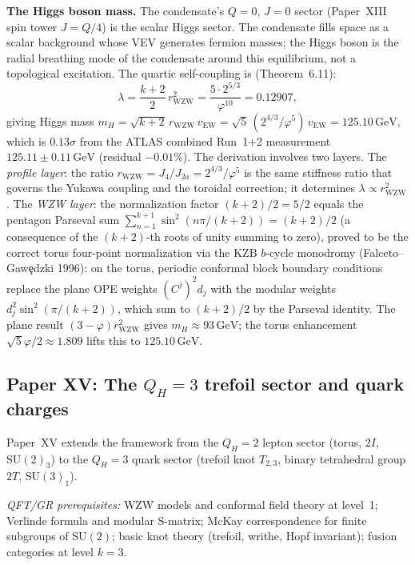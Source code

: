 \documentclass[11pt,a4paper]{article}
\newcommand{\vp}{\varphi}
\newcommand{\twoI}{2I}
\newcommand{\vEW}{v_{\mathrm{EW}}}
\newcommand{\mH}{m_H}
\begin{document}
\textbf{The Higgs boson mass.}
The condensate's $Q=0$, $J=0$ sector (Paper~XIII spin tower $J=Q/4$) is the scalar
Higgs sector. The condensate fills space as a scalar background whose VEV generates
fermion masses; the Higgs boson is the radial breathing mode of the condensate around
this equilibrium, not a topological excitation.
The quartic self-coupling is (Theorem~6.11):
\begin{equation}
  \lambda = \frac{k+2}{2}\,r_{\mathrm{WZW}}^2
  = \frac{5\cdot 2^{5/3}}{\vp^{10}} = 0.12907,
\end{equation}
giving Higgs mass $\mH = \sqrt{k+2}\,r_{\mathrm{WZW}}\,\vEW
= \sqrt{5}\,(2^{4/3}/\vp^5)\,\vEW = 125.10\,\mathrm{GeV}$,
which is $0.13\sigma$ from the ATLAS combined Run~1+2 measurement
$125.11\pm0.11\,\mathrm{GeV}$ (residual $-0.01\%$).
The derivation involves two layers.
The \emph{profile layer}: the ratio $r_{\mathrm{WZW}} = J_4/J_{2a} = 2^{4/3}/\vp^5$
is the same stiffness ratio that governs the Yukawa coupling and the toroidal
correction; it determines $\lambda \propto r_{\mathrm{WZW}}^2$.
The \emph{WZW layer}: the normalization factor $(k+2)/2 = 5/2$ equals the
pentagon Parseval sum $\sum_{n=1}^{k+1}\sin^2(n\pi/(k+2)) = (k+2)/2$
(a consequence of the $(k+2)$-th roots of unity summing to zero), proved to be
the correct torus four-point normalization via the KZB $b$-cycle monodromy
(Falceto--Gaw\c{e}dzki 1996): on the torus, periodic conformal block boundary
conditions replace the plane OPE weights $(C^j)^2 d_j$ with the modular
weights $d_j^2\sin^2(\pi/(k+2))$, which sum to $(k+2)/2$ by the Parseval
identity.
The plane result $(3-\vp)r_{\mathrm{WZW}}^2$ gives $\mH \approx 93\,\mathrm{GeV}$;
the torus enhancement $\sqrt{5}\vp/2 \approx 1.809$ lifts this to $125.10\,\mathrm{GeV}$.

\subsection{Paper XV: The $Q_H=3$ trefoil sector and quark charges}

Paper~XV extends the framework from the $Q_H=2$ lepton sector (torus, $\twoI$,
$\mathrm{SU}(2)_3$) to the $Q_H=3$ quark sector (trefoil knot $T_{2,3}$,
binary tetrahedral group $2T$, $\mathrm{SU}(3)_1$).

\textit{QFT/GR prerequisites:} WZW models and conformal field theory at level~1;
Verlinde formula and modular S-matrix; McKay correspondence for finite
subgroups of $\mathrm{SU}(2)$; basic knot theory (trefoil, writhe, Hopf invariant);
fusion categories at level $k=3$.
\end{document}
